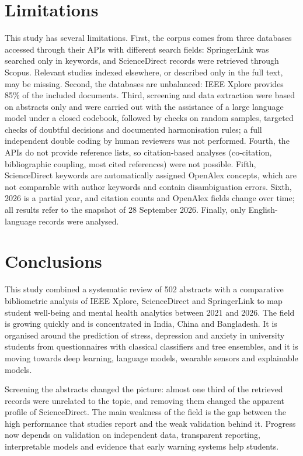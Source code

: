 \documentclass[11pt,a4paper]{article}
\begin{document}
\section{Limitations}\label{sec:limitations}

This study has several limitations. First, the corpus comes from three databases accessed through their APIs with different search fields: SpringerLink was searched only in keywords, and ScienceDirect records were retrieved through Scopus. Relevant studies indexed elsewhere, or described only in the full text, may be missing. Second, the databases are unbalanced: IEEE Xplore provides 85\% of the included documents. Third, screening and data extraction were based on abstracts only and were carried out with the assistance of a large language model under a closed codebook, followed by checks on random samples, targeted checks of doubtful decisions and documented harmonisation rules; a full independent double coding by human reviewers was not performed. Fourth, the APIs do not provide reference lists, so citation-based analyses (co-citation, bibliographic coupling, most cited references) were not possible. Fifth, ScienceDirect keywords are automatically assigned OpenAlex concepts, which are not comparable with author keywords and contain disambiguation errors. Sixth, 2026 is a partial year, and citation counts and OpenAlex fields change over time; all results refer to the snapshot of 28 September 2026. Finally, only English-language records were analysed.

\section{Conclusions}\label{sec:conclusions}

This study combined a systematic review of 502 abstracts with a comparative bibliometric analysis of IEEE Xplore, ScienceDirect and SpringerLink to map student well-being and mental health analytics between 2021 and 2026. The field is growing quickly and is concentrated in India, China and Bangladesh. It is organised around the prediction of stress, depression and anxiety in university students from questionnaires with classical classifiers and tree ensembles, and it is moving towards deep learning, language models, wearable sensors and explainable models.

Screening the abstracts changed the picture: almost one third of the retrieved records were unrelated to the topic, and removing them changed the apparent profile of ScienceDirect. The main weakness of the field is the gap between the high performance that studies report and the weak validation behind it. Progress now depends on validation on independent data, transparent reporting, interpretable models and evidence that early warning systems help students.
\end{document}
